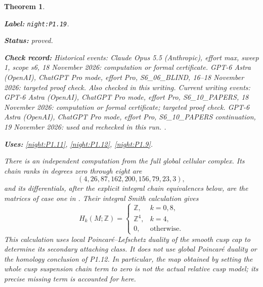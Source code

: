 \documentclass[11pt,a4paper]{article}
\newtheorem{theorem}{Theorem}[section]
\theoremstyle{definition}
\newcommand{\StatementRecord}[4]{\par\smallskip\begingroup\upshape\raggedright\noindent\textbf{Label:} \nolinkurl{#1}.\par\noindent\textbf{Status:} #2.\par\noindent\textbf{Check record:} #3.\par\noindent\textbf{Uses:} #4.\par\endgroup\smallskip}
\begin{document}
\begin{theorem}\label{night:P1.19}
\StatementRecord{night:P1.19}{proved}{Historical events: Claude Opus 5.5 (Anthropic), effort max, sweep 1, scope s6, 18 November 2026: computation or formal certificate. GPT-6 Astra (OpenAI), ChatGPT Pro mode, effort Pro, S6\_06\_BLIND, 16--18 November 2026: targeted proof check. Also checked in this writing. Current writing events: GPT-6 Astra (OpenAI), ChatGPT Pro mode, effort Pro, S6\_10\_PAPERS, 18 November 2026: computation or formal certificate; targeted proof check. GPT-6 Astra (OpenAI), ChatGPT Pro mode, effort Pro, S6\_10\_PAPERS continuation, 19 November 2026: used and rechecked in this run. }{\cref{night:P1.11}, \cref{night:P1.12}, \cref{night:P1.9}}
There is an independent computation from the full global cellular
complex.  Its chain ranks in degrees zero through eight are
\[
 (4,26,87,162,200,156,79,23,3),
\]
and its differentials, after the explicit integral chain equivalences
below, are the matrices of case one in
.
Their integral Smith calculation gives
\[
 H_k(M;\mathbb Z)=
 \begin{cases}
 \mathbb Z,&k=0,8,\\
 \mathbb Z^4,&k=4,\\
 0,&\text{otherwise}.
 \end{cases}
\]
This calculation uses local Poincar\'e--Lefschetz duality of the
smooth cusp cap to determine its secondary attaching class.  It does
not use global Poincar\'e duality or the homology conclusion of P1.12.
In particular, the map obtained by setting the whole cusp suspension
chain term to zero is not the actual relative cusp model; its precise
missing term is accounted for here.
\end{theorem}
\end{document}
